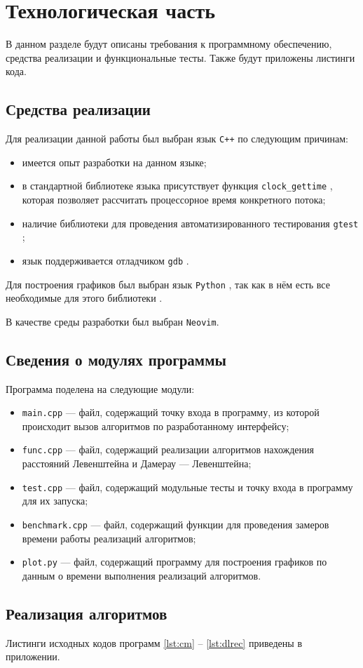 \section{Технологическая часть}

В данном разделе будут описаны требования к программному обеспечению, средства реализации и функциональные тесты.
Также будут приложены листинги кода.

\subsection{Средства реализации}

Для реализации данной работы был выбран язык \texttt{C++} \cite{isocpp} по следующим причинам:
\begin{itemize}
    \item имеется опыт разработки на данном языке;
    \item в стандартной библиотеке языка присутствует функция \texttt{clock\_gettime} \cite{cpptime}, которая позволяет рассчитать процессорное время конкретного потока;
    \item наличие библиотеки для проведения автоматизированного тестирования \texttt{gtest} \cite{gtest};
    \item язык поддерживается отладчиком \texttt{gdb} \cite{gdb}.
\end{itemize}

Для построения графиков был выбран язык \texttt{Python} \cite{python}, так как в нём есть все необходимые для этого библиотеки \cite{pd} \cite{np} \cite{mpl}.

В качестве среды разработки был выбран \texttt{Neovim}. %

\subsection{Сведения о модулях программы}

Программа поделена на следующие модули:
\begin{itemize}
    \item \texttt{main.cpp} --- файл, содержащий точку входа в программу, из которой происходит вызов алгоритмов по разработанному интерфейсу;
    \item \texttt{func.cpp} --- файл, содержащий реализации алгоритмов нахождения расстояний Левенштейна и Дамерау --- Левенштейна;
    \item \texttt{test.cpp} --- файл, содержащий модульные тесты и точку входа в программу для их запуска;
    \item \texttt{benchmark.cpp} --- файл, содержащий функции для проведения замеров времени работы реализаций алгоритмов;
    \item \texttt{plot.py} --- файл, содержащий программу для построения графиков по данным о времени выполнения реализаций алгоритмов.
\end{itemize}

\subsection{Реализация алгоритмов}

Листинги исходных кодов программ \ref{lst:cm} -- \ref{lst:dlrec} приведены в приложении.
